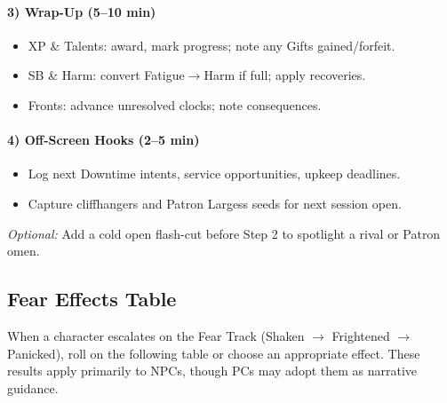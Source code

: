 \paragraph{3) Wrap-Up (5–10 min)}
\begin{itemize}
  \item XP \& Talents: award, mark progress; note any Gifts gained/forfeit.
  \item SB \& Harm: convert Fatigue$\to$Harm if full; apply recoveries.
  \item Fronts: advance unresolved clocks; note consequences.
\end{itemize}

\paragraph{4) Off-Screen Hooks (2–5 min)}
\begin{itemize}
  \item Log next Downtime intents, service opportunities, upkeep deadlines.
  \item Capture cliffhangers and Patron Largess seeds for next session open.
\end{itemize}

\emph{Optional:} Add a cold open flash-cut before Step 2 to spotlight a rival or Patron omen.

\subsection{Fear Effects Table}
\label{subsec:fear-table}

When a character escalates on the Fear Track (Shaken $\rightarrow$ Frightened $\rightarrow$ Panicked), roll on the following table or choose an appropriate effect. These results apply primarily to NPCs, though PCs may adopt them as narrative guidance.

